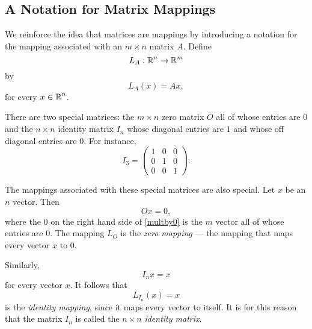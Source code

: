 \documentclass{ximera}
\begin{document}
\subsection*{A Notation for Matrix Mappings}

We reinforce the idea that matrices are mappings by introducing a notation 
for the mapping associated with an $m\times n$ matrix $A$.  Define
\[
L_A:\mbox{$\Bbb{R}$}^n\to\mbox{$\Bbb{R}$}^m
\]
by
\[
L_A(x) = Ax,
\]
for every $x\in\mbox{$\Bbb{R}$}^n$.

There are two special matrices:  the $m\times n$ zero matrix 
 $O$ all of whose entries are $0$ and the 
$n\times n$ identity matrix  $I_n$ whose diagonal 
entries are $1$ and whose off diagonal entries are $0$.  For instance,
\[
	I_3 = \left(
\begin{array}{rrr}
 1 & 0 & 0  \\
 0 & 1 & 0  \\
 0 & 0 & 1
\end{array}
\right).
\]

The mappings associated with these special matrices are also special.  
Let $x$ be an $n$ vector.  Then
\begin{equation} \label{multby0}
Ox=0,
\end{equation}
where the $0$ on the right hand side of \eqref{multby0} is the $m$
vector all of whose entries are $0$.  The mapping $L_O$ is the 
{\em zero mapping\/}  --- the mapping 
that maps every vector $x$ to $0$.

Similarly,
\[
I_nx=x
\]
for every vector $x$.  It follows that
\[
L_{I_n}(x) = x
\]
is the {\em identity mapping\/},  since
it maps every vector to itself.  It is for this reason that the
matrix $I_n$ is called the $n\times n$ {\em identity matrix\/}.

\EXER

\TEXER
\end{document}
